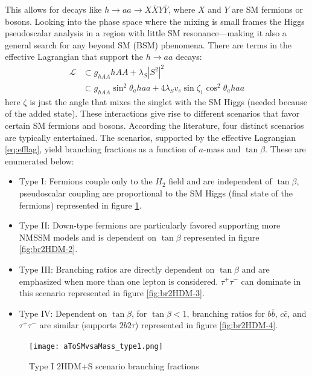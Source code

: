 This allows for decays like $h\rightarrow aa \rightarrow X\bar{X}Y\bar{Y}$, where $X$ and $Y$ are SM fermions or bosons. Looking into the phase space where the mixing is small frames the Higgs pseudoscalar analysis in a region with little SM resonance---making it also a general search for any beyond SM (BSM) phenomena.
There are terms in the effective Lagrangian that support the $h \rightarrow aa $ decays:
\begin{align}
\label{eq:efflag}
\mathcal{L} &\subset g_{hAA}hAA + \lambda_S|S^2|^2  \\
            &\subset g_{hAA}\sin^2\theta_a haa + 4\lambda_S v_s \sin{\zeta_1} \cos^2\theta_a haa \nonumber 
\end{align}
here $\zeta$ is just the angle that mixes the singlet with the SM Higgs (needed because of the added state). These interactions give rise to different scenarios that favor certain SM fermions and bosons. According the literature, four distinct scenarios are typically entertained.  The scenarios, supported by the effective Lagrangian \ref{eq:efflag}, yield branching fractions as a function of $a$-mass and $\tan\beta$.  These are enumerated below:
\begin{itemize}
\item Type I: Fermions couple only to the $H_2$ field and are independent of $\tan\beta$, pseudoscalar coupling are proportional to the SM Higgs (final state of the fermions) represented in figure \ref{fig:br2HDM-1}.
\item Type II: Down-type fermions are particularly favored supporting more NMSSM models and is dependent on $\tan\beta$ represented in figure \ref{fig:br2HDM-2}. 
\item Type III: Branching ratios are directly dependent on $\tan\beta$ and are emphasized when more than one lepton is considered. $\tau^+ \tau^-$ can dominate in this scenario represented in figure \ref{fig:br2HDM-3}. 
\item Type IV: Dependent on $\tan\beta$, for $\tan \beta < 1 $, branching ratios for $b\bar{b}$, $c\bar{c}$, and $\tau^+ \tau^-$ are similar (supports $2b2\tau$) represented in figure \ref{fig:br2HDM-4}.
\end{itemize}


\begin{figure}[ht!b]
  \centering
\texttt{[image: aToSMvsaMass\_type1.png]}           \\
    \caption{\label{fig:br2HDM-1} Type I 2HDM+S scenario branching fractions ~\cite{Branco_2012}}
\end{figure}


